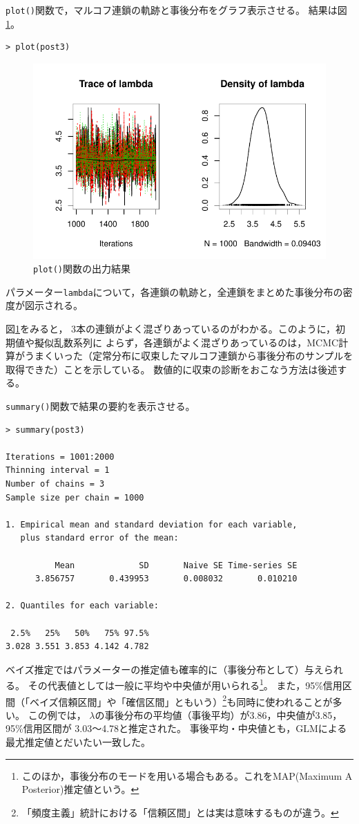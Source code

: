 \documentclass[11pt,uplatex]{jsarticle}
\begin{document}
\texttt{plot()}関数で，マルコフ連鎖の軌跡と事後分布をグラフ表示させる。
結果は図\ref{fig:plot}。
\begin{lstlisting}
> plot(post3)
\end{lstlisting}

\begin{figure}[hbtp]
  \begin{center}
    \includegraphics[bb=0 0 360 240, clip, width=260 bp]{example1-3.pdf}
  \end{center}
  \caption{\texttt{plot()}関数の出力結果}
  \label{fig:plot}
\end{figure}\noindent
パラメーター\texttt{lambda}について，各連鎖の軌跡と，全連鎖をまとめた事後分布の密度が図示される。

図\ref{fig:plot}をみると，
3本の連鎖がよく混ざりあっているのがわかる。このように，初期値や擬似乱数系列に
よらず，各連鎖がよく混ざりあっているのは，MCMC計算がうまくいった（定常分布に収束したマルコフ連鎖から事後分布のサンプルを取得できた）ことを示している。
数値的に収束の診断をおこなう方法は後述する。


\texttt{summary()}関数で結果の要約を表示させる。
\begin{lstlisting}
> summary(post3)

Iterations = 1001:2000
Thinning interval = 1 
Number of chains = 3 
Sample size per chain = 1000 

1. Empirical mean and standard deviation for each variable,
   plus standard error of the mean:

          Mean             SD       Naive SE Time-series SE 
      3.856757       0.439953       0.008032       0.010210 

2. Quantiles for each variable:

 2.5%   25%   50%   75% 97.5% 
3.028 3.551 3.853 4.142 4.782 

\end{lstlisting}
%
ベイズ推定ではパラメーターの推定値も確率的に（事後分布として）与えられる。
その代表値としては一般に平均や中央値が用いられる\footnote{このほか，事後分布のモードを用いる場合もある。これをMAP(Maximum A Posterior)推定値という。}。
また，95\%信用区間（「ベイズ信頼区間」や「確信区間」ともいう）\footnote{「頻度主義」統計における「信頼区間」とは実は意味するものが違う。}も同時に使われることが多い。
この例では，
$\lambda$の事後分布の平均値（事後平均）が3.86，中央値が3.85，95\%信用区間が
3.03〜4.78と推定された。
事後平均・中央値とも，GLMによる最尤推定値とだいたい一致した。
\end{document}

